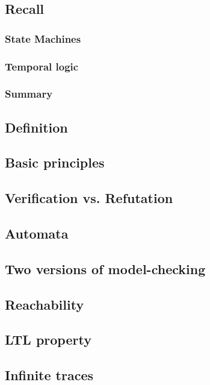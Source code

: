 \documentclass[12pt, a4paper]{book}
\begin{document}
  \subsection{Recall}
  \label{sub:Recall}
  \subsubsection{State Machines}
  \label{subs:State Machines}
  \subsubsection{Temporal logic}
  \label{subs:Temporal logic}
  \subsubsection{Summary}
  \label{subs:Summary}
  \subsection{Definition}
  \label{sub:Definition}
  \subsection{Basic principles}
  \label{sub:Basic principles}
  \subsection{Verification vs. Refutation}
  \label{sub:Verification vs. Refutation}
  \subsection{Automata}
  \label{sub:Automata}
  \subsection{Two versions of model-checking}
  \label{sub:Two versions of model-checking}
  \subsection{Reachability}
  \label{sub:Reachability}
  \subsection{LTL property}
  \label{sub:LTL property}
  \subsection{Infinite traces}
  \label{sub:Infinite traces}
\end{document}
